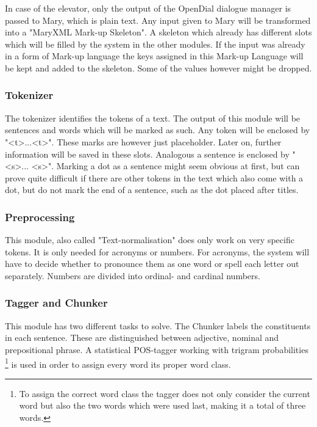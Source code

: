 \documentclass[a4paper, 12pt]{article}
\begin{document}
In case of the elevator, only the output of the OpenDial dialogue manager is passed to Mary, which is plain text.
Any input given to Mary will be transformed into a "MaryXML Mark-up Skeleton".
A skeleton which already has different slots which will be filled by the system in the other modules.
If the input was already in a form of Mark-up language the keys assigned in this Mark-up Language will be kept and added to the skeleton. Some of the values however might be dropped.

\subsubsection*{Tokenizer}

The tokenizer identifies the tokens of a text. The output of this module will be sentences and words which will be marked as such.
Any token will be enclosed by "\textless t\textgreater ...\textless  t\textgreater".
These marks are however just placeholder.
Later on, further information will be saved in these slots.
Analogous a sentence is enclosed by "\textless s\textgreater ... \textless s\textgreater".
Marking a dot as a sentence might seem obvious at first, but can prove quite difficult if there are other tokens in the text which also come with a dot, but do not mark the end of a sentence, such as the dot placed after titles.

\subsubsection*{Preprocessing}

This module, also called "Text-normalisation" does only work on very specific tokens.
It is only needed for acronyms or numbers.
For acronyms, the system will have to decide whether to pronounce them as one word or spell each letter out separately.
Numbers are divided into ordinal- and cardinal numbers.

\subsubsection*{Tagger and Chunker}

This module has two different tasks to solve.
The Chunker labels the constituents in each sentence.
These are distinguished between adjective, nominal and prepositional phrase.
A statistical POS-tagger working with trigram probabilities \footnote {To assign the correct word class the tagger does not only consider the current word but also the two words which were used last, making it a total of three words.} is used in order to assign every word its proper word class.
\end{document}
